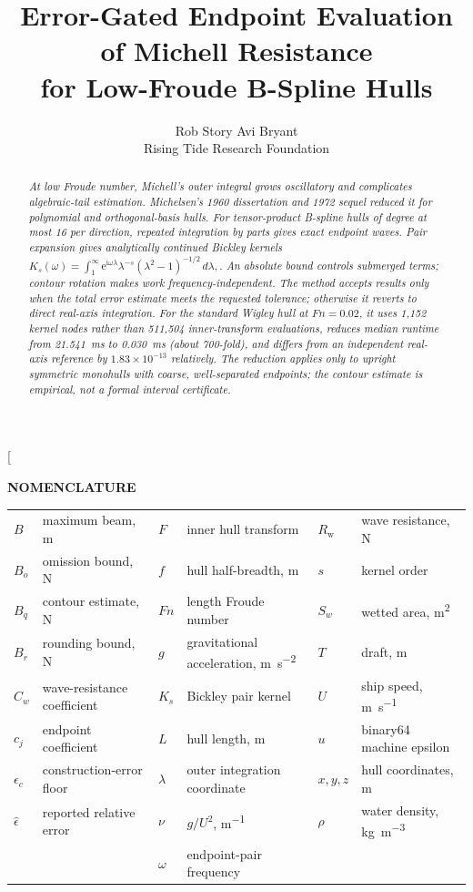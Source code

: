\documentclass[10pt]{article}
\title{\fontsize{18}{21}\selectfont\bfseries
Error-Gated Endpoint Evaluation of Michell Resistance\\
for Low-Froude B-Spline Hulls}
\author{Rob Story \qquad Avi Bryant\\[0.5ex]
\small Rising Tide Research Foundation}
\date{}
\newcommand{\Fn}{\mathit{Fn}}
\newcommand{\iu}{\mathrm{i}}
\newcommand{\e}{\mathrm{e}}
\begin{document}
\makeatletter
\twocolumn[
\begin{@twocolumnfalse}
\maketitle

\begin{abstract}
\itshape
At low Froude number, Michell's outer integral grows oscillatory and
complicates algebraic-tail estimation.  Michelsen's 1960 dissertation and
1972 sequel reduced it for polynomial and orthogonal-basis hulls.  For
tensor-product B-spline hulls of degree at most 16 per direction,
repeated integration by parts gives exact endpoint waves.  Pair expansion
gives analytically continued Bickley kernels
\(
K_s(\omega)=\int_1^\infty
\e^{\iu\omega\lambda}\lambda^{-s}(\lambda^2-1)^{-1/2}\,d\lambda,
\).
An absolute bound controls submerged terms; contour rotation makes work
frequency-independent.  The method accepts results only when the total error
estimate meets the requested tolerance; otherwise it
reverts to direct real-axis integration.  For the standard Wigley hull at
\(\Fn=0.02\), it uses 1,152 kernel nodes rather than 511,504 inner-transform
evaluations, reduces median runtime from
\SI{21.541}{ms} to \SI{0.030}{ms} (about 700-fold), and differs from an
independent real-axis reference by \(1.83\times10^{-13}\) relatively.  The
reduction applies only to upright symmetric monohulls with coarse,
well-separated endpoints; the contour estimate is empirical, not a
formal interval certificate.
\end{abstract}

\vspace{0.6em}
\noindent\textbf{NOMENCLATURE}\par
\begingroup
\footnotesize
\setlength{\tabcolsep}{0.45em}
\begin{tabular}{@{}ll@{\qquad}ll@{\qquad}ll@{}}
\(B\) & maximum beam, \si{m} & \(F\) & inner hull transform & \(R_{\mathrm w}\) & wave resistance, \si{N}\\
\(B_o\) & omission bound, \si{N} & \(f\) & hull half-breadth, \si{m} & \(s\) & kernel order\\
\(B_q\) & contour estimate, \si{N} & \(\Fn\) & length Froude number & \(S_w\) & wetted area, \si{m^2}\\
\(B_r\) & rounding bound, \si{N} & \(g\) & gravitational acceleration, \si{m.s^{-2}} & \(T\) & draft, \si{m}\\
\(C_w\) & wave-resistance coefficient & \(K_s\) & Bickley pair kernel & \(U\) & ship speed, \si{m.s^{-1}}\\
\(c_j\) & endpoint coefficient & \(L\) & hull length, \si{m} & \(u\) & binary64 machine epsilon\\
\(\epsilon_c\) & construction-error floor & \(\lambda\) & outer integration coordinate & \(x,y,z\) & hull coordinates, \si{m}\\
\(\widehat\epsilon\) & reported relative error & \(\nu\) & \(g/U^2\), \si{m^{-1}} & \(\rho\) & water density, \si{kg.m^{-3}}\\
& & \(\omega\) & endpoint-pair frequency & &
\end{tabular}
\endgroup


\end{@twocolumnfalse}
\end{document}
